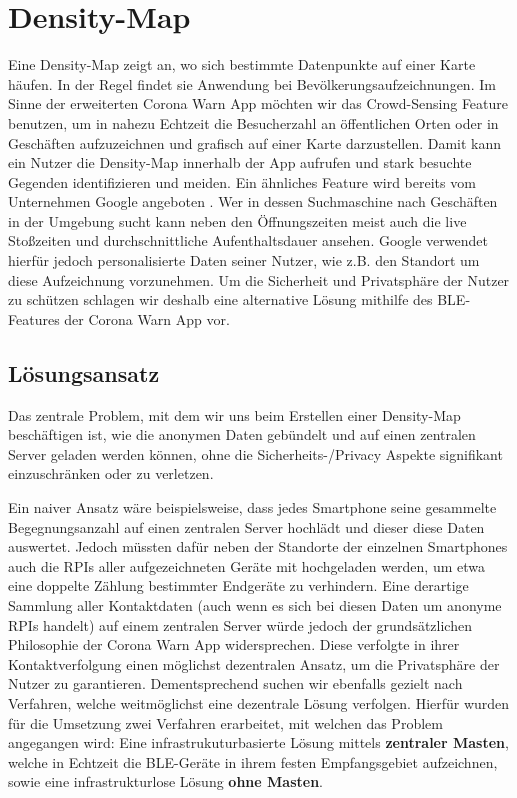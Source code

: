 \documentclass[conference,compsoc]{IEEEtran}
\begin{document}
\section{Density-Map}
\label{Density_Map}
Eine Density-Map zeigt an, wo sich bestimmte Datenpunkte auf einer Karte häufen. 
In der Regel findet sie Anwendung bei Bevölkerungsaufzeichnungen. 
Im Sinne der erweiterten Corona Warn App möchten wir das Crowd-Sensing Feature benutzen, 
um in nahezu Echtzeit die Besucherzahl an öffentlichen Orten oder in Geschäften aufzuzeichnen und grafisch auf einer Karte darzustellen. 
Damit kann ein Nutzer die Density-Map innerhalb der App aufrufen und stark besuchte Gegenden identifizieren und meiden. 
Ein ähnliches Feature wird bereits vom Unternehmen Google angeboten \cite{GoogleStosszeiten}. 
Wer in dessen Suchmaschine nach Geschäften in der Umgebung sucht kann neben den Öffnungszeiten meist auch die live Stoßzeiten und durchschnittliche Aufenthaltsdauer ansehen. 
Google verwendet hierfür jedoch personalisierte Daten seiner Nutzer, wie z.B. den Standort um diese Aufzeichnung vorzunehmen. 
Um die Sicherheit und Privatsphäre der Nutzer zu schützen schlagen wir deshalb eine alternative Lösung mithilfe des BLE-Features der Corona Warn App vor. \\

\subsection{Lösungsansatz} \label{Lösungsansatz}
Das zentrale Problem, mit dem wir uns beim Erstellen einer Density-Map beschäftigen ist, 
wie die anonymen Daten gebündelt und auf einen zentralen Server geladen werden können, ohne die Sicherheits-/Privacy Aspekte signifikant einzuschränken oder zu verletzen. 

Ein naiver Ansatz wäre beispielsweise, dass jedes Smartphone seine gesammelte Begegnungsanzahl auf einen zentralen Server hochlädt und dieser diese Daten auswertet. 
Jedoch müssten dafür neben der Standorte der einzelnen Smartphones auch die RPIs aller aufgezeichneten Geräte mit hochgeladen werden, um etwa eine doppelte Zählung bestimmter Endgeräte zu verhindern. 
Eine derartige Sammlung aller Kontaktdaten (auch wenn es sich bei diesen Daten um anonyme RPIs handelt) auf einem zentralen Server würde jedoch der grundsätzlichen Philosophie der Corona Warn App widersprechen.
Diese verfolgte in ihrer Kontaktverfolgung einen möglichst dezentralen Ansatz, um die Privatsphäre der Nutzer zu garantieren.
Dementsprechend suchen wir ebenfalls gezielt nach Verfahren, welche weitmöglichst eine dezentrale Lösung verfolgen.
Hierfür wurden für die Umsetzung zwei Verfahren erarbeitet, mit welchen das Problem angegangen wird: Eine infrastrukuturbasierte Lösung mittels \textbf{zentraler Masten}, welche in Echtzeit die BLE-Geräte in ihrem festen Empfangsgebiet aufzeichnen, sowie eine infrastrukturlose Lösung \textbf{ohne Masten}. \\ \\
\end{document}
